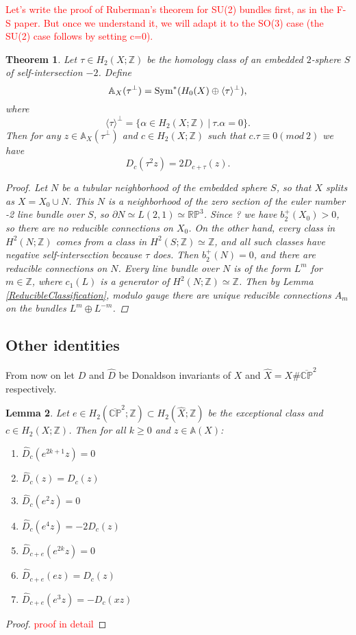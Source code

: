 \documentclass[a4paper]{article}
\newcommand{\Z}{\mathbb{Z}}
\newcommand{\R}{\mathbb{R}}
\newcommand{\C}{\mathbb{C}}
\renewcommand{\P}{\mathbb{P}}
\newcommand{\Sym}{\textnormal{Sym}}
\newcommand{\del}{\partial}
\newtheorem{theorem}{Theorem}
\newtheorem{lemma}[theorem]{Lemma}
\theoremstyle{definition}
\numberwithin{theorem}{subsection}
\begin{document}
\textcolor{red}{Let's write the proof of Ruberman's theorem for SU(2) bundles first, as in the F-S paper. But once we understand it, we will adapt it to the SO(3) case (the SU(2) case follows by setting c=0).}
\begin{theorem}\cite{Ruberman}\label{TheoremRuberman}
Let $\tau \in H_2(X;\Z)$ be the homology class of an embedded $2$-sphere $S$ of self-intersection $-2$. Define
$$\mathbb{A}_{X}(\tau^{\bot})=\Sym^*(H_0(X)\oplus \langle\tau \rangle^{\bot}),$$
where 
$$\langle\tau\rangle^{\perp}=\{\alpha\in H_2(X;\Z)\ |\ \tau.\alpha = 0\}.$$
Then for any $z\in \mathbb{A}_{X}(\tau^{\bot})$ and $c\in H_{2}(X;\Z)$ such that $c.\tau \equiv 0(mod~2)$ we have
$$D_{c}(\tau^{2}z)=2D_{c+\tau}(z).$$
\begin{proof} 
Let $N$ be a tubular neighborhood of the embedded sphere $S$, so that $X$ splits as $X=X_0\cup N$. This $N$ is a neighborhood of the zero section of the euler number -2 line bundle over $S$, so $\del N\simeq L(2,1)\simeq \R\P^3$. Since ? we have $b_2^+(X_0)>0$, so there are no reducible connections on $X_0$. On the other hand, every class in $H^2(N;\Z)$ comes from a class in $H^2(S;\Z)\simeq \Z$, and all such classes have negative self-intersection because $\tau$ does. Then $b_2^+(N)=0$, and there are reducible connections on $N$. Every line bundle over $N$ is of the form $L^m$ for $m\in\Z$, where $c_1(L)$ is a generator of $H^2(N;\Z)\simeq \Z$. Then by Lemma \ref{ReducibleClassification}, modulo gauge there are unique reducible connections $A_{m}$ on the bundles $L^m\oplus L^{-m}$. 



\end{proof}
\end{theorem}

\subsection{Other identities}
From now on let $D$ and $\hat{D}$ be Donaldson invariants of $X$ and $\hat{X}=X\#\overline{\C\P}^{2}$ respectively.
\begin{lemma}\label{SevenIdentities}
Let $e\in H_{2}(\overline{\C\P}^{2};\Z)\subset H_{2}(\hat{X};\Z)$ be the exceptional class and $c\in H_{2}(X;\Z)$. Then for all $k\geq 0$ and $z\in\mathbb{A}(X)$:
\begin{enumerate}
    \item $\hat{D}_{c}(e^{2k+1}z)=0$
    \item $\hat{D}_{c}(z)=D_{c}(z)$
    \item $\hat{D}_{c}(e^{2}z)=0$
    \item $\hat{D}_{c}(e^{4}z)=-2D_{c}(z)$
    \item $\hat{D}_{c+e}(e^{2k}z)=0$
    \item $\hat{D}_{c+e}(ez)=D_{c}(z)$
    \item $\hat{D}_{c+e}(e^{3}z)=-D_{c}(xz)$
\end{enumerate}
\end{lemma}
\begin{proof}
\textcolor{red}{proof in detail}     
\end{proof}
\end{document}
